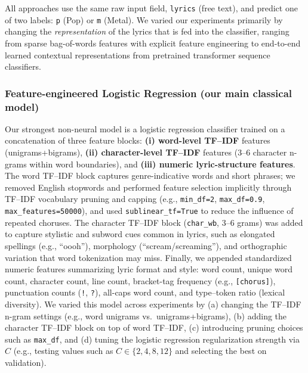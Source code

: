 All approaches use the same raw input field, \texttt{lyrics} (free text), and predict one of two labels: \texttt{p} (Pop) or \texttt{m} (Metal). We varied our experiments primarily by changing the \emph{representation} of the lyrics that is fed into the classifier, ranging from sparse bag-of-words features with explicit feature engineering to end-to-end learned contextual representations from pretrained transformer sequence classifiers.

\subsubsection{Feature-engineered Logistic Regression (our main classical model)}
Our strongest non-neural model is a logistic regression classifier trained on a concatenation of three feature blocks: \textbf{(i) word-level TF--IDF} features (unigrams+bigrams), \textbf{(ii) character-level TF--IDF} features (3--6 character n-grams within word boundaries), and \textbf{(iii) numeric lyric-structure features}. The word TF--IDF block captures genre-indicative words and short phrases; we removed English stopwords and performed feature selection implicitly through TF--IDF vocabulary pruning and capping (e.g., \texttt{min\_df=2}, \texttt{max\_df=0.9}, \texttt{max\_features=50000}), and used \texttt{sublinear\_tf=True} to reduce the influence of repeated choruses. The character TF--IDF block (\texttt{char\_wb}, 3--6 grams) was added to capture stylistic and subword cues common in lyrics, such as elongated spellings (e.g., ``oooh''), morphology (``scream/screaming''), and orthographic variation that word tokenization may miss. Finally, we appended standardized numeric features summarizing lyric format and style: word count, unique word count, character count, line count, bracket-tag frequency (e.g., \texttt{[chorus]}), punctuation counts (\texttt{!}, \texttt{?}), all-caps word count, and type--token ratio (lexical diversity). We varied this model across experiments by (a) changing the TF--IDF n-gram settings (e.g., word unigrams vs.\ unigrams+bigrams), (b) adding the character TF--IDF block on top of word TF--IDF, (c) introducing pruning choices such as \texttt{max\_df}, and (d) tuning the logistic regression regularization strength via $C$ (e.g., testing values such as $C \in \{2,4,8,12\}$ and selecting the best on validation).

